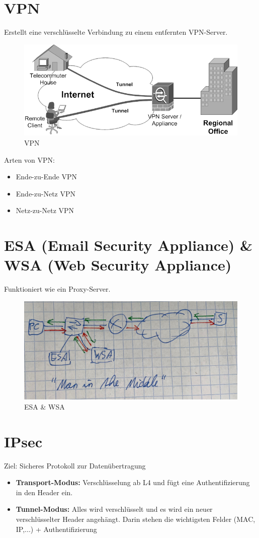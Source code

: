 \section{VPN} 
Erstellt eine verschlüsselte Verbindung zu einem entfernten VPN-Server.

\begin{figure}[H]
	\centering
	\includegraphics[width=0.8\linewidth]{figures/vpn.png}
	\caption{VPN}
\end{figure}

Arten von VPN:
\begin{itemize}
	\item Ende-zu-Ende VPN
	\item Ende-zu-Netz VPN
	\item Netz-zu-Netz VPN
\end{itemize}

\section{ESA (Email Security Appliance) \& WSA (Web Security Appliance)}
Funktioniert wie ein Proxy-Server.
\begin{figure}[H]
	\centering
	\includegraphics[width=0.8\linewidth]{figures/esawsa.jpeg}
	\caption{ESA \& WSA}
\end{figure}

\section{IPsec}
Ziel: Sicheres Protokoll zur Datenübertragung
\begin{itemize}
	\item \textbf{Transport-Modus:} Verschlüsselung ab L4 und fügt eine Authentifizierung in den Header ein.
	\item \textbf{Tunnel-Modus:} Alles wird verschlüsselt und es wird ein neuer verschlüsselter Header angehängt. Darin stehen die wichtigsten Felder (MAC, IP,...) + Authentifizierung
\end{itemize}